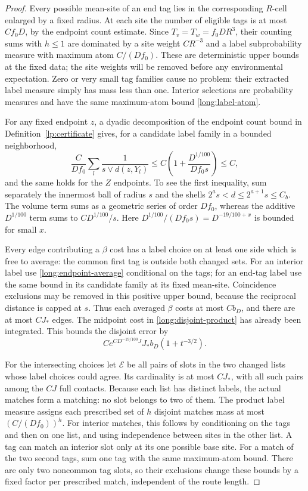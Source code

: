\begin{proof}
Every possible mean-site of an end tag lies in the corresponding $R$-cell
enlarged by a fixed radius.  At each site the number of eligible tags is
at most $Cf_0D$, by the endpoint count estimate.  Since
$T_v=T_w=f_0DR^3$, their counting sums with $h\le1$ are dominated by a
site weight $CR^{-3}$ and a label subprobability measure with maximum atom
$C/(Df_0)$.  These are deterministic upper bounds at the fixed data;
the site weights will be removed before any environmental expectation.
Zero or very small tag families cause no problem: their extracted label
measure simply has mass less than one.  Interior selections are probability
measures and have the same maximum-atom bound
\eqref{long:label-atom}.

For any fixed endpoint $z$, a dyadic decomposition of the endpoint count
bound in Definition~\ref{lp:certificate} gives, for a candidate label family
in a bounded neighborhood,
\begin{equation}\label{long:endpoint-average}
 \frac{C}{Df_0}\sum_l\frac1{s\vee d(z,Y_l)}
          \le C\left(1+\frac{D^{1/100}}{Df_0s}\right)\le C,
\end{equation}
and the same holds for the $Z$ endpoints.  To see the first inequality,
sum separately the innermost ball of radius $s$ and the shells
$2^as<d\le2^{a+1}s\le C_b$.  The volume term sums as a geometric
series of order $Df_0$, whereas the additive $D^{1/100}$ term sums to
$CD^{1/100}/s$.  Here $D^{1/100}/(Df_0s)=D^{-19/100+x}$ is bounded
for small $x$.

Every edge contributing a $\beta$ cost has a label choice on at least one
side which is free to average: the common first tag is outside both changed
sets.  For an interior label use \eqref{long:endpoint-average} conditional
on the tags; for an end-tag label use the same bound in its candidate
family at its fixed mean-site.  Coincidence exclusions may be removed in
this positive upper bound, because the reciprocal distance is capped at
$s$.  Thus each averaged $\beta$ costs at most $Cb_D$, and there are at
most $CJ_*$ edges.  The midpoint cost in
\eqref{long:disjoint-product} has already been integrated.  This bounds
the disjoint error by
\[
       C e^{C D^{-19/100}J}J_*b_D(1+t^{-3/2}).
\]

For the intersecting choices let $\mathcal E$ be all pairs of slots in
the two changed lists whose label choices could agree.  Its cardinality
is at most $CJ_*$, with all such pairs among the $CJ$ full contacts.
Because each list has distinct labels, the actual matches form a matching:
no slot belongs to two of them.  The product label measure assigns each
prescribed set of $h$ disjoint matches mass at most $(C/(Df_0))^h$.
For interior matches,
this follows by conditioning on the tags and then on one list, and using
independence between sites in the other list.  A tag can match an interior
slot only at its one possible base site.  For a match of the two second
tags, sum one tag with the same maximum-atom bound.  There are only two
noncommon tag slots, so their exclusions change these bounds by a fixed
factor per prescribed match, independent of the route length.


\end{proof}
